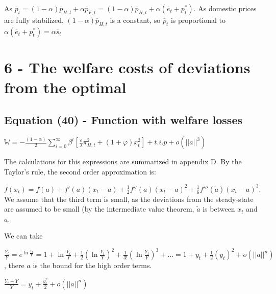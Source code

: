 \documentclass[
]{article}
\begin{document}
As
\(\overline{p}_t=(1-\alpha) \overline{p}_{H,t}+\alpha\overline{p}_{F,t} = (1-\alpha)\overline{p}_{H,t}+\alpha(\overline{e}_{t}+p_t^*)\).
As domestic prices are fully stabilized,
\((1-\alpha)\overline{p}_{H,t}\) is a constant, so \(\overline{p}_t\) is
proportional to
\(\alpha(\overline{e}_{t}+p_t^*) = \alpha \overline{s}_t\)

\vspace{12pt}

\hypertarget{the-welfare-costs-of-deviations-from-the-optimal}{%
\section{6 - The welfare costs of deviations from the
optimal}\label{the-welfare-costs-of-deviations-from-the-optimal}}

\vspace{12pt}

\hypertarget{equation-40---function-with-welfare-losses}{%
\subsection{Equation (40) - Function with welfare
losses}\label{equation-40---function-with-welfare-losses}}

\(\displaystyle \mathbb{W}= -\frac{(1-\alpha)}{2}\sum_{i=0}^{\infty} \beta^t \left[ \frac{\varepsilon}{\lambda}\pi_{H,t}^2+ (1+\varphi)x_t^2 \right] + t.i.p+ o(||a||^3)\)

\vspace{8pt}

The calculations for this expressions are summarized in appendix D. By
the Taylor's rule, the second order approximation is:

\(\displaystyle f(x_t) = f(a) + f'(a)(x_t-a) + \frac{1}{2}f''(a)(x_t-a)^2 + \frac{1}{6}f'''(\widetilde{a})(x_t-a)^3\).
We assume that the third term is small, as the deviations from the
steady-state are assumed to be small (by the intermediate value theorem,
\(\widetilde{a}\) is between \(x_t\) and \(a\).

We can take

\(\displaystyle \frac{Y_t}{Y}=e^{\ln \frac{Y_t}{Y}}=1+\ln \frac{Y_t}{Y}+\frac{1}{2} \left( \ln \frac{Y_t}{Y} \right)^2 + \frac{1}{3!}\left( \ln \frac{Y_t}{Y} \right)^3 + ... = 1+y_t+\frac{1}{2} \left( y_t \right)^2+o(||a||^n)\),
there \(a\) is the bound for the high order terms.

\(\displaystyle \frac{Y_t-Y}{Y}= y_t+\frac{y_t^2}{2} +o(||a||^n)\)
\end{document}

